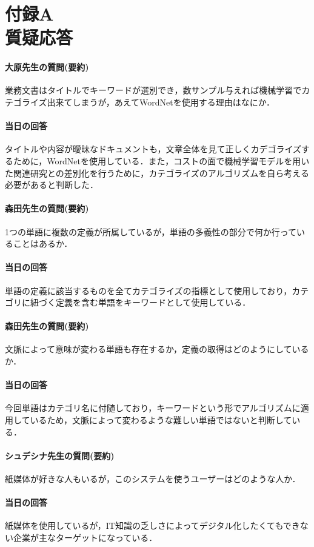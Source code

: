 
\chapter*{付録A\\質疑応答}

\subsubsection*{大原先生の質問(要約)}
業務文書はタイトルでキーワードが選別でき，数サンプル与えれば機械学習でカテゴライズ出来てしまうが，あえてWordNetを使用する理由はなにか．
\subsubsection*{当日の回答}
タイトルや内容が曖昧なドキュメントも，文章全体を見て正しくカデゴライズするために，WordNetを使用している．また，コストの面で機械学習モデルを用いた関連研究との差別化を行うために，カテゴライズのアルゴリズムを自ら考える必要があると判断した．

\subsubsection*{森田先生の質問(要約)}
1つの単語に複数の定義が所属しているが，単語の多義性の部分で何か行っていることはあるか．
\subsubsection*{当日の回答}
単語の定義に該当するものを全てカテゴライズの指標として使用しており，カテゴリに紐づく定義を含む単語をキーワードとして使用している．

\subsubsection*{森田先生の質問(要約)}
文脈によって意味が変わる単語も存在するか，定義の取得はどのようにしているか．
\subsubsection*{当日の回答}
今回単語はカテゴリ名に付随しており，キーワードという形でアルゴリズムに適用しているため，文脈によって変わるような難しい単語ではないと判断している．

\subsubsection*{シュデシナ先生の質問(要約)}
紙媒体が好きな人もいるが，このシステムを使うユーザーはどのような人か．
\subsubsection*{当日の回答}
紙媒体を使用しているが，IT知識の乏しさによってデジタル化したくてもできない企業が主なターゲットになっている．
